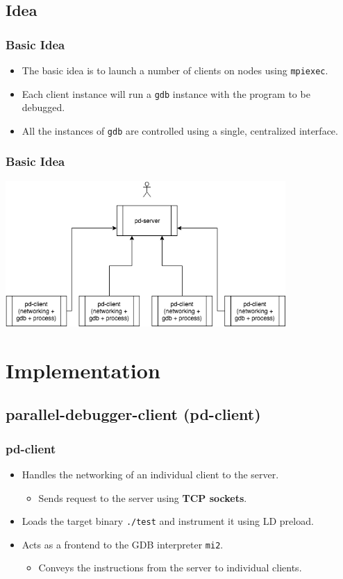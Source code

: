 \documentclass{beamer}
\begin{document}
\subsection{Idea}
\begin{frame}
  \frametitle{Basic Idea}
\begin{itemize}
  \item <1-> The basic idea is to launch a number of clients on nodes using \texttt{mpiexec}.
  \item <2-> Each client instance will run a \texttt{gdb} instance with the program to be debugged.
  \item <3-> All the instances of \texttt{gdb} are controlled using a single, centralized interface.
\end{itemize}
\end{frame}

\begin{frame}
  \frametitle{Basic Idea}
   \includegraphics[width=0.8\textwidth]{flow}
\end{frame}
\section{Implementation}
\subsection{parallel-debugger-client (pd-client)}

\begin{frame}
  \frametitle{pd-client}
  \begin{itemize}
  \item <1-> Handles the networking of an individual client to the server.
    \begin{itemize}
      \item <2-> Sends request to the server using \textbf{TCP sockets}.
    \end{itemize}
    \item  <3-> Loads the target binary \texttt{./test} and instrument it using
    LD preload.
  \item <4-> Acts as a frontend to the GDB interpreter \texttt{mi2}.
    \begin{itemize}
    \item <5-> Conveys the instructions from the server to individual clients.
    \end{itemize}
  \end{itemize}
\end{frame}
\end{document}
